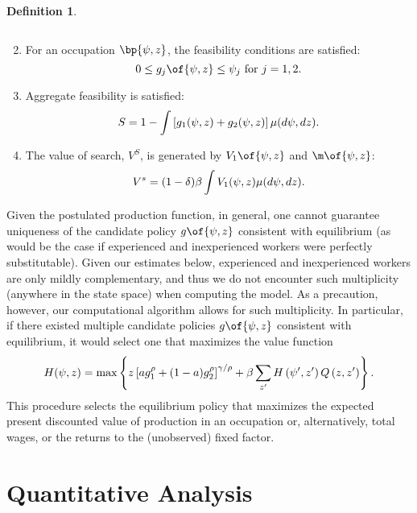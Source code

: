 \documentclass[12pt]{article}
\theoremstyle{definition}
\newtheorem{definition}{Definition}
\begin{document}
\begin{definition}
\begin{enumerate}
\begin{equation}
		\end{equation}
		\item For an occupation $\bp{\psi, z}$, the feasibility conditions are satisfied:
		\begin{equation}
			\notag
			0 \leq g_j\of{\psi, z} \leq \psi_j \text{ for } j = 1, 2.
		\end{equation}
		\item Aggregate feasibility is satisfied:
		\begin{equation}
			\notag
			S=1-\int\left[g_1(\psi, z)+g_2(\psi, z)\right] \mu(d \psi, d z) .
		\end{equation}
		\item The value of search, $V^S$, is generated by $V_1\of{\psi, z}$ and $\m\of{\psi, z}$:
		\begin{equation}
			\notag
			V^s=(1-\delta) \beta \int V_1(\psi, z) \mu(d \psi, d z).
		\end{equation}
	\end{enumerate}
\end{definition}

Given the postulated production function, in general, one cannot guarantee uniqueness of the candidate policy $g\of{\psi, z}$ consistent with equilibrium (as would be the case if experienced and inexperienced workers were perfectly substitutable). Given our estimates below, experienced and inexperienced workers are only mildly complementary, and thus we do not encounter such multiplicity (anywhere in the state space) when computing the model. As a precaution, however, our computational algorithm allows for such multiplicity. In particular, if there existed multiple candidate policies $g\of{\psi, z}$ consistent with equilibrium, it would select one that maximizes the value function 
\begin{equation}
    \notag 
    H(\psi, z)=\max \left\{z\left[a g_1^\rho+(1-a) g_2^\rho\right]^{\gamma / \rho}+\beta \sum_{z^{\prime}} H\left(\psi^{\prime}, z^{\prime}\right) Q\left(z, z^{\prime}\right)\right\} .
\end{equation}
This procedure selects the equilibrium policy that maximizes the expected present discounted value of production in an occupation or, alternatively, total wages, or the returns to the (unobserved) fixed factor.

\section{Quantitative Analysis}
\end{document}
